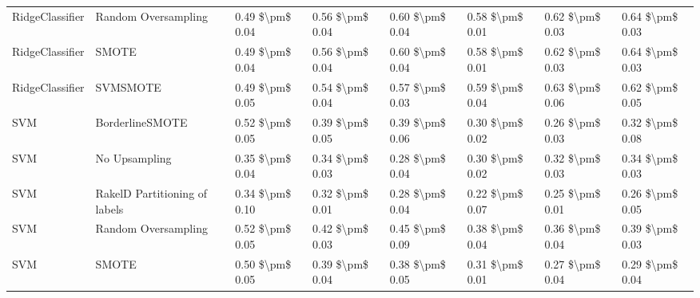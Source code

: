 \begin{tabular}{llllllll}
                RidgeClassifier &           Random Oversampling & 0.49 \$\textbackslash pm\$ 0.04 &           0.56 \$\textbackslash pm\$ 0.04 &       0.60 \$\textbackslash pm\$ 0.04 &        0.58 \$\textbackslash pm\$ 0.01 &                         0.62 \$\textbackslash pm\$ 0.03 &     0.64 \$\textbackslash pm\$ 0.03 \\
                RidgeClassifier &                         SMOTE & 0.49 \$\textbackslash pm\$ 0.04 &           0.56 \$\textbackslash pm\$ 0.04 &       0.60 \$\textbackslash pm\$ 0.04 &        0.58 \$\textbackslash pm\$ 0.01 &                         0.62 \$\textbackslash pm\$ 0.03 &     0.64 \$\textbackslash pm\$ 0.03 \\
                RidgeClassifier &                      SVMSMOTE & 0.49 \$\textbackslash pm\$ 0.05 &           0.54 \$\textbackslash pm\$ 0.04 &       0.57 \$\textbackslash pm\$ 0.03 &        0.59 \$\textbackslash pm\$ 0.04 &                         0.63 \$\textbackslash pm\$ 0.06 &     0.62 \$\textbackslash pm\$ 0.05 \\
                            SVM &               BorderlineSMOTE & 0.52 \$\textbackslash pm\$ 0.05 &           0.39 \$\textbackslash pm\$ 0.05 &       0.39 \$\textbackslash pm\$ 0.06 &        0.30 \$\textbackslash pm\$ 0.02 &                         0.26 \$\textbackslash pm\$ 0.03 &     0.32 \$\textbackslash pm\$ 0.08 \\
                            SVM &                 No Upsampling & 0.35 \$\textbackslash pm\$ 0.04 &           0.34 \$\textbackslash pm\$ 0.03 &       0.28 \$\textbackslash pm\$ 0.04 &        0.30 \$\textbackslash pm\$ 0.02 &                         0.32 \$\textbackslash pm\$ 0.03 &     0.34 \$\textbackslash pm\$ 0.03 \\
                            SVM & RakelD Partitioning of labels & 0.34 \$\textbackslash pm\$ 0.10 &           0.32 \$\textbackslash pm\$ 0.01 &       0.28 \$\textbackslash pm\$ 0.04 &        0.22 \$\textbackslash pm\$ 0.07 &                         0.25 \$\textbackslash pm\$ 0.01 &     0.26 \$\textbackslash pm\$ 0.05 \\
                            SVM &           Random Oversampling & 0.52 \$\textbackslash pm\$ 0.05 &           0.42 \$\textbackslash pm\$ 0.03 &       0.45 \$\textbackslash pm\$ 0.09 &        0.38 \$\textbackslash pm\$ 0.04 &                         0.36 \$\textbackslash pm\$ 0.04 &     0.39 \$\textbackslash pm\$ 0.03 \\
                            SVM &                         SMOTE & 0.50 \$\textbackslash pm\$ 0.05 &           0.39 \$\textbackslash pm\$ 0.04 &       0.38 \$\textbackslash pm\$ 0.05 &        0.31 \$\textbackslash pm\$ 0.01 &                         0.27 \$\textbackslash pm\$ 0.04 &     0.29 \$\textbackslash pm\$ 0.04 \\

\end{tabular}
